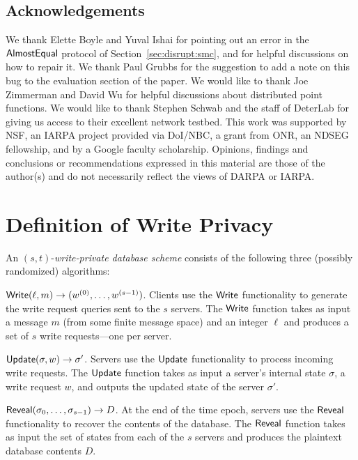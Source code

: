 \documentclass[10pt,twocolumn]{article}
\begin{document}
\subsection*{Acknowledgements}
We thank Elette Boyle and Yuval Ishai for pointing out an error in 
the ${\sf AlmostEqual}$ protocol of Section~\ref{sec:disrupt:smc},
and for helpful discussions on how to repair it.
We thank Paul Grubbs for the suggestion to add a note on this bug
to the evaluation section of the paper.
We would like to thank Joe Zimmerman and David
Wu for helpful discussions about distributed point functions.
We would like to thank Stephen Schwab and the staff of
DeterLab for giving us access to their excellent network testbed. 
This work was supported by NSF, an IARPA project provided via DoI/NBC,
a grant from ONR, an NDSEG fellowship, 
and by a Google faculty scholarship. Opinions,
findings and conclusions or recommendations expressed in this material
are those of the author(s) and do not necessarily reflect the views of
DARPA or IARPA.



 


\frenchspacing


\nonfrenchspacing

\appendix
\section{Definition of Write Privacy}
\label{app:game}

An $(s,t)$-{\em write-private database scheme}
consists of the following three (possibly randomized) algorithms: 

\medskip

\begin{hangparas}{0.25in}{1}
  ${\sf Write}(\ell, m) \to (w^{(0)}, \dots, w^{(s-1)})$.
  Clients use the ${\sf Write}$ functionality to generate the
  write request queries sent to the $s$ servers. 
  The ${\sf Write}$ function takes as input a message $m$ (from some 
  finite message space) and an integer $\ell$ and produces a set of $s$
  write requests---one per server.
  
  ${\sf Update}(\sigma, w) \to \sigma'$.
  Servers use the ${\sf Update}$ functionality to process incoming
  write requests.
  The ${\sf Update}$ function takes as input a server's internal state
  $\sigma$, a write request $w$, and outputs the updated state of the server $\sigma'$.

  ${\sf Reveal}(\sigma_0, \dots, \sigma_{s-1}) \to D$.
  At the end of the time epoch, servers use the ${\sf Reveal}$ functionality
  to recover the contents of the database.
  The ${\sf Reveal}$ function takes as input the set of states from
  each of the $s$ servers and produces the plaintext database contents $D$.
\end{hangparas}
\end{document}

